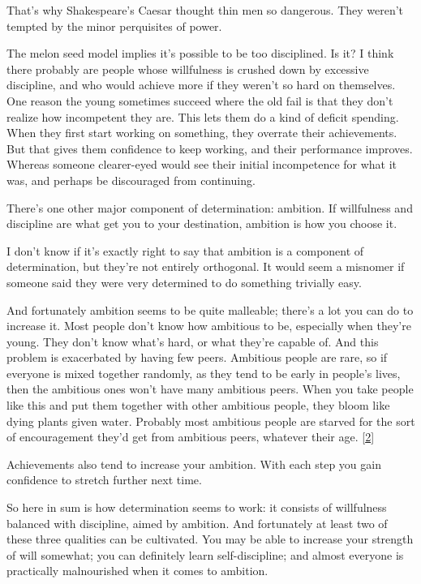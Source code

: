 That's why Shakespeare's Caesar thought thin men so dangerous. They
weren't tempted by the minor perquisites of power.

The melon seed model implies it's possible to be too disciplined. Is it?
I think there probably are people whose willfulness is crushed down by
excessive discipline, and who would achieve more if they weren't so hard
on themselves. One reason the young sometimes succeed where the old fail
is that they don't realize how incompetent they are. This lets them do a
kind of deficit spending. When they first start working on something,
they overrate their achievements. But that gives them confidence to keep
working, and their performance improves. Whereas someone clearer-eyed
would see their initial incompetence for what it was, and perhaps be
discouraged from continuing.

There's one other major component of determination: ambition. If
willfulness and discipline are what get you to your destination,
ambition is how you choose it.

I don't know if it's exactly right to say that ambition is a component
of determination, but they're not entirely orthogonal. It would seem a
misnomer if someone said they were very determined to do something
trivially easy.

And fortunately ambition seems to be quite malleable; there's a lot you
can do to increase it. Most people don't know how ambitious to be,
especially when they're young. They don't know what's hard, or what
they're capable of. And this problem is exacerbated by having few peers.
Ambitious people are rare, so if everyone is mixed together randomly, as
they tend to be early in people's lives, then the ambitious ones won't
have many ambitious peers. When you take people like this and put them
together with other ambitious people, they bloom like dying plants given
water. Probably most ambitious people are starved for the sort of
encouragement they'd get from ambitious peers, whatever their age.
{[}\hyperref[f2n]{2}{]}

Achievements also tend to increase your ambition. With each step you
gain confidence to stretch further next time.

So here in sum is how determination seems to work: it consists of
willfulness balanced with discipline, aimed by ambition. And fortunately
at least two of these three qualities can be cultivated. You may be able
to increase your strength of will somewhat; you can definitely learn
self-discipline; and almost everyone is practically malnourished when it
comes to ambition.

